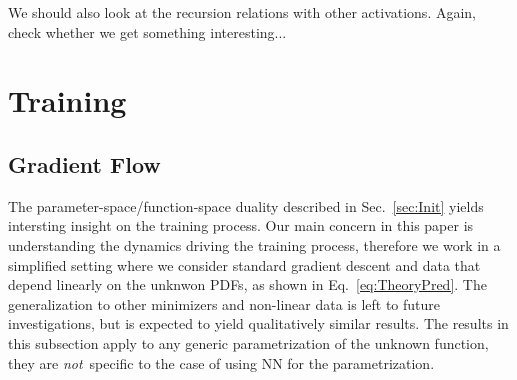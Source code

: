 \documentclass[11pt]{article}
\begin{document}
We should also look at the recursion relations with other activations. Again, check whether we
get something interesting... 


\section{Training}
\label{sec:Training}

\subsection{Gradient Flow}
\label{sec:GradFlow}

The parameter-space/function-space duality described in Sec.~\ref{sec:Init} yields intersting insight
on the training process. Our main concern in this paper is understanding the dynamics driving the 
training process, therefore we work in a simplified setting where we consider standard gradient descent 
and data that depend linearly on the unknwon PDFs, as shown in Eq.~\eqref{eq:TheoryPred}. The generalization
to other minimizers and non-linear data is left to future investigations, but is expected to yield 
qualitatively similar results. The results
in this subsection apply to any generic parametrization of the unknown function, they are {\em not}\ 
specific to the case of using NN for the parametrization. 
\end{document}
